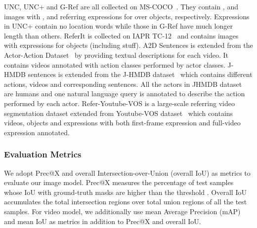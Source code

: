 \documentclass[10pt,journal,cspaper,compsoc]{IEEEtran}
\begin{document}
UNC, UNC+ and G-Ref are all collected on MS-COCO~\cite{lin2014microsoft}. They contain ,  and  images with ,  and  referring expressions for over  objects, respectively. 
Expressions in UNC+ contain no location words while those in G-Ref have much longer length than others. 
ReferIt is collected on IAPR TC-12~\cite{escalante2010segmented} and contains 
 images with  expressions for  objects (including stuff).
A2D Sentences is extended from the Actor-Action Dataset~\cite{xu2015can} by providing textual descriptions for each video. 
It contains  videos annotated with  action classes performed by  actor classes.
J-HMDB sentences is extended from the J-HMDB dataset~\cite{jhuang2013towards} which contains  different actions,  videos and corresponding  sentences. All the actors in JHMDB dataset are humans and one natural language query is annotated to describe the action performed by each actor.
Refer-Youtube-VOS is a large-scale referring video segmentation dataset extended from Youtube-VOS dataset~\cite{xu2018youtube} which contains  videos,  objects and  expressions with both first-frame expression and full-video expression annotated.


\subsubsection{Evaluation Metrics}
We adopt Prec@X and overall Intersection-over-Union (overall IoU) as metrics to evaluate our image model. 
Prec@X measures the percentage of test samples whose IoU with ground-truth masks are higher than the threshold . 
Overall IoU accumulates the total intersection regions over total union regions of all the test samples. 
For video model, we additionally use mean Average Precision (mAP) and mean IoU as metrics in addition to Prec@X and overall IoU.
\end{document}

